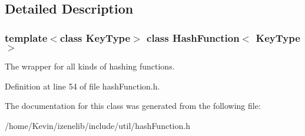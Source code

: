 \subsection{Detailed Description}
\subsubsection*{template$<$class KeyType$>$ class HashFunction$<$ KeyType $>$}

The wrapper for all kinds of hashing functions. 

Definition at line 54 of file hashFunction.h.

The documentation for this class was generated from the following file:\begin{CompactItemize}
\item 
/home/Kevin/izenelib/include/util/hashFunction.h\end{CompactItemize}
